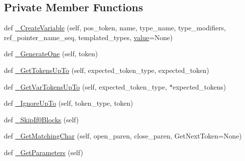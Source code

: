 \subsection*{Private Member Functions}
\begin{DoxyCompactItemize}
\item 
def \mbox{\hyperlink{classgoogletest-master_1_1googlemock_1_1scripts_1_1generator_1_1cpp_1_1ast_1_1_ast_builder_a99cd414fc15b479fcb302f5d08308193}{\+\_\+\+Create\+Variable}} (self, pos\+\_\+token, name, type\+\_\+name, type\+\_\+modifiers, ref\+\_\+pointer\+\_\+name\+\_\+seq, templated\+\_\+types, \mbox{\hyperlink{_obj__test_2lib_2googletest-master_2googlemock_2test_2gmock-matchers__test_8cc_a337b8a670efc0b086ad3af163f3121b6}{value}}=None)
\item 
def \mbox{\hyperlink{classgoogletest-master_1_1googlemock_1_1scripts_1_1generator_1_1cpp_1_1ast_1_1_ast_builder_a856942d08a1ef88d63d9860672092003}{\+\_\+\+Generate\+One}} (self, token)
\item 
def \mbox{\hyperlink{classgoogletest-master_1_1googlemock_1_1scripts_1_1generator_1_1cpp_1_1ast_1_1_ast_builder_a8739b247ed06e1bf0c25fedda454a25a}{\+\_\+\+Get\+Tokens\+Up\+To}} (self, expected\+\_\+token\+\_\+type, expected\+\_\+token)
\item 
def \mbox{\hyperlink{classgoogletest-master_1_1googlemock_1_1scripts_1_1generator_1_1cpp_1_1ast_1_1_ast_builder_a4f85680891062ae9dd39772ad3c75205}{\+\_\+\+Get\+Var\+Tokens\+Up\+To}} (self, expected\+\_\+token\+\_\+type, $\ast$expected\+\_\+tokens)
\item 
def \mbox{\hyperlink{classgoogletest-master_1_1googlemock_1_1scripts_1_1generator_1_1cpp_1_1ast_1_1_ast_builder_af29acb49d911c2bf756b376fa09447ce}{\+\_\+\+Ignore\+Up\+To}} (self, token\+\_\+type, token)
\item 
def \mbox{\hyperlink{classgoogletest-master_1_1googlemock_1_1scripts_1_1generator_1_1cpp_1_1ast_1_1_ast_builder_a677b9192e4e4c0c2106a793e9aba1901}{\+\_\+\+Skip\+If0\+Blocks}} (self)
\item 
def \mbox{\hyperlink{classgoogletest-master_1_1googlemock_1_1scripts_1_1generator_1_1cpp_1_1ast_1_1_ast_builder_a9d33f41e338e376f115030234fa1ff46}{\+\_\+\+Get\+Matching\+Char}} (self, open\+\_\+paren, close\+\_\+paren, Get\+Next\+Token=None)
\item 
def \mbox{\hyperlink{classgoogletest-master_1_1googlemock_1_1scripts_1_1generator_1_1cpp_1_1ast_1_1_ast_builder_afcc9f0b0976f9d56818bb03256d36c1f}{\+\_\+\+Get\+Parameters}} (self)
\item 

\end{DoxyCompactItemize}
